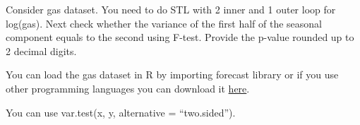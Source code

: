 
\begin{question}
Consider gas dataset. You need to do STL with 2 inner and 1 outer loop for log(gas). Next check whether the variance of the first half of the seasonal component equals to the second using F-test. Provide the p-value rounded up to 2 decimal digits.

You can load the gas dataset in R by importing forecast library or if you use other programming languages you can download it \href{https://github.com/vincentarelbundock/Rdatasets/blob/master/csv/forecast/gas.csv}{here}.
\end{question}

\begin{solution}
You can use var.test(x, y, alternative = ``two.sided'').
\end{solution}

